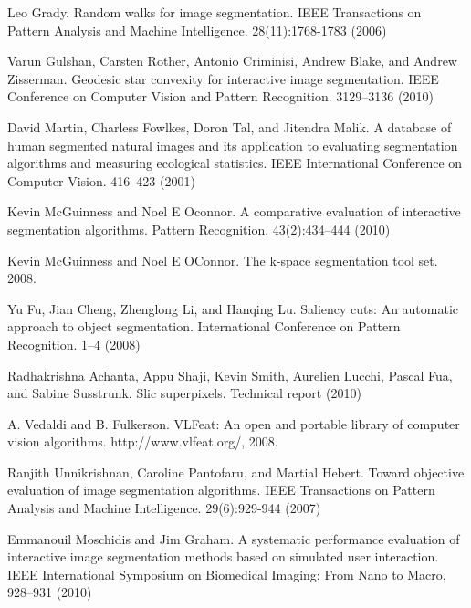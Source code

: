 \documentclass[runningheads,a4paper]{llncs}
\begin{document}
\begin{thebibliography}{4}
 Leo Grady. Random walks for image segmentation. IEEE Transactions on Pattern Analysis and Machine Intelligence. 28(11):1768-1783 (2006)

 Varun Gulshan, Carsten Rother, Antonio Criminisi, Andrew Blake, and Andrew Zisserman. Geodesic star convexity for interactive image segmentation. IEEE Conference on Computer Vision and Pattern Recognition. 3129--3136 (2010)
    
 David Martin, Charless Fowlkes, Doron Tal, and Jitendra Malik. A database of human segmented natural images and its application to evaluating segmentation algorithms and measuring ecological statistics. IEEE International Conference on Computer Vision. 416--423 (2001)
    
 Kevin McGuinness and Noel E Oconnor. A comparative evaluation of interactive segmentation algorithms. Pattern Recognition. 43(2):434--444 (2010)
    
 Kevin McGuinness and Noel E OConnor. The k-space segmentation tool set. 2008.

 Yu Fu, Jian Cheng, Zhenglong Li, and Hanqing Lu. Saliency cuts: An automatic approach to object segmentation. International Conference on Pattern Recognition. 1--4 (2008)
    
 Radhakrishna Achanta, Appu Shaji, Kevin Smith, Aurelien Lucchi, Pascal Fua, and Sabine Susstrunk. Slic superpixels. Technical report (2010)

 A. Vedaldi and B. Fulkerson. VLFeat: An open and portable library of computer vision algorithms. http://www.vlfeat.org/, 2008.
    
 Ranjith Unnikrishnan, Caroline Pantofaru, and Martial Hebert. Toward objective evaluation of image segmentation algorithms. IEEE Transactions on Pattern Analysis and Machine Intelligence. 29(6):929-944 (2007)
    
Emmanouil Moschidis and Jim Graham. A systematic performance evaluation of interactive image segmentation methods based on simulated user interaction. IEEE International Symposium on Biomedical Imaging: From Nano to Macro, 928--931 (2010)
    
\end{thebibliography}
\end{document}
